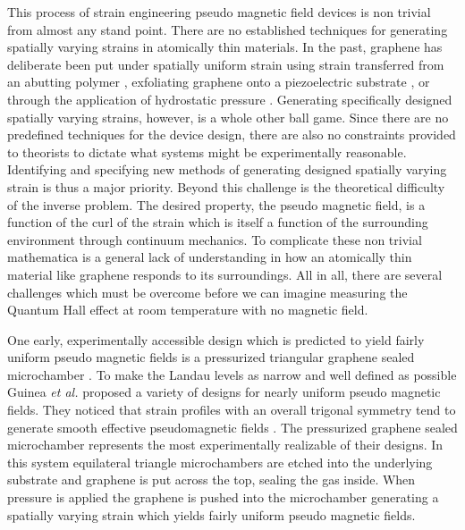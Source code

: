 This process of strain engineering pseudo magnetic field devices is non trivial from almost any stand point.
There are no established techniques for generating spatially varying strains in atomically thin materials.
In the past, graphene has deliberate been put under spatially uniform strain using strain transferred from an abutting polymer \cite{Yu2008,Ni2008,Tsoukleri2009,Huang2009,Mohiuddin2009,Frank2010,Yoon2011}, exfoliating graphene onto a piezoelectric substrate \cite{Ding2010,Jie2013}, or through the application of hydrostatic pressure \cite{Proctor2009,Clark2012}.
Generating specifically designed spatially varying strains, however, is a whole other ball game.
Since there are no predefined techniques for the device design, there are also no constraints provided to theorists to dictate what systems might be experimentally reasonable.
Identifying and specifying new methods of generating designed spatially varying strain is thus a major priority.
Beyond this challenge is the theoretical difficulty of the inverse problem.
The desired property, the pseudo magnetic field, is a function of the curl of the strain which is itself a function of the surrounding environment through continuum mechanics.
To complicate these non trivial mathematica is a general lack of understanding in how an atomically thin material like graphene responds to its surroundings.
All in all, there are several challenges which must be overcome before we can imagine measuring the Quantum Hall effect at room temperature with no magnetic field.

One early, experimentally accessible design which is predicted to yield fairly uniform pseudo magnetic fields is a pressurized triangular graphene sealed microchamber \cite{Guinea2009}.
To make the Landau levels as narrow and well defined as possible Guinea \emph{et al.} proposed a variety of designs for nearly uniform pseudo magnetic fields.
They noticed that strain profiles with an overall trigonal symmetry tend to generate smooth effective pseudomagnetic fields \cite{Guinea2009}.
The pressurized graphene sealed microchamber represents the most experimentally realizable of their designs.
In this system equilateral triangle microchambers are etched into the underlying substrate and graphene is put across the top, sealing the gas inside.
When pressure is applied the graphene is pushed into the microchamber generating a spatially varying strain which yields fairly uniform pseudo magnetic fields.

